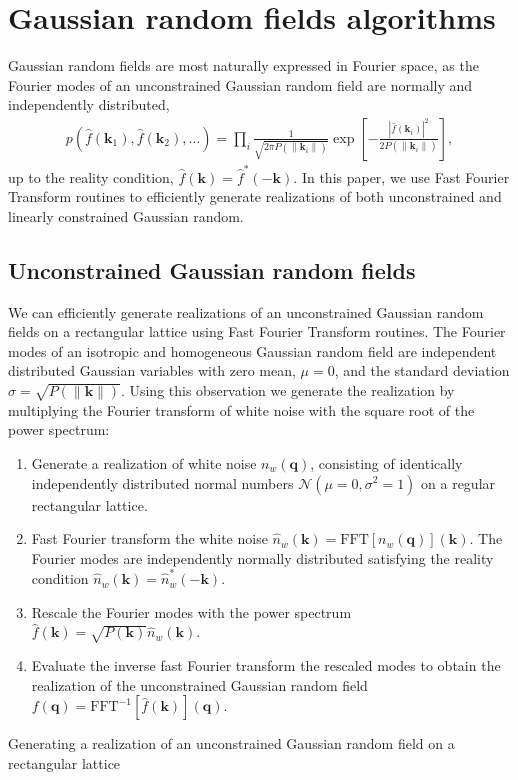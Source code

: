 \documentclass[a4paper, 11pt]{article}
\begin{document}
\section{Gaussian random fields algorithms}\label{ap:GRF}
Gaussian random fields are most naturally expressed in Fourier space, as the Fourier modes of an unconstrained Gaussian random field are normally and independently distributed, 
\begin{align}
p(\hat{f}(\bm{k}_1), \hat{f}(\bm{k}_2), \dots) = \prod_{i} \frac{1}{\sqrt{2\pi P(\| \bm{k}_i\|)}} \exp\left[-\frac{|\hat{f}(\bm{k}_i)|^2}{2P(\|\bm{k}_i\|)}\right],
\end{align}
up to the reality condition, $\hat{f}(\bm{k})=\hat{f}^*(-\bm{k})$. In this paper, we use Fast Fourier Transform routines to efficiently generate realizations of both unconstrained and linearly constrained Gaussian random.

\subsection{Unconstrained Gaussian random fields}
We can efficiently generate realizations of an unconstrained Gaussian random fields on a rectangular lattice using Fast Fourier Transform routines. The Fourier modes of an isotropic and homogeneous Gaussian random field are independent distributed Gaussian variables with zero mean, $\mu=0$, and the standard deviation $\sigma = \sqrt{P(\|\bm{k}\|)}$. Using this observation we generate the realization by multiplying the Fourier transform of white noise with the square root of the power spectrum:\\

\begin{algorithm}[H]
\SetAlgoLined
\begin{enumerate}[itemsep=1ex, leftmargin=0cm, rightmargin=1cm]
\item Generate a realization of white noise $n_w(\bm{q})$, consisting of identically independently distributed normal numbers $\mathcal{N}(\mu=0,\sigma^2=1)$ on a regular rectangular lattice.
\item Fast Fourier transform the white noise $\hat{n}_w(\bm{k}) = \text{FFT}[n_w(\bm{q})](\bm{k})$. The Fourier modes are independently normally distributed satisfying the reality condition $\hat{n}_w(\bm{k}) = \hat{n}_w^*(-\bm{k})$.
\item Rescale the Fourier modes with the power spectrum $\hat{f}(\bm{k}) = \sqrt{P(\bm{k})}\hat{n}_w(\bm{k})$.
\item Evaluate the inverse fast Fourier transform the rescaled modes to obtain the realization of the unconstrained Gaussian random field $f(\bm{q}) = \text{FFT}^{-1}[\hat{f}(\bm{k})](\bm{q})$.
\end{enumerate}
 \caption{Generating a realization of an unconstrained Gaussian random field on a rectangular lattice}
 \label{alg:GRF}
\end{algorithm}$ $\\
\end{document}
